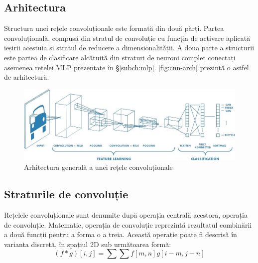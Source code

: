 \subsection*{Arhitectura}
Structura unei rețele convoluționale este formată din două părți.
Partea convoluțională, compusă din stratul de convoluție cu funcția de activare aplicată ieșirii acestuia și stratul de reducere a dimensionalității. A doua parte a structurii este partea de clasificare alcătuită din straturi de neuroni complet conectați asemenea rețelei MLP prezentate în \S\ref{subch:mlp}. \autoref{fig:cnn-arch} prezintă o astfel de arhitectură.
\begin{figure}[ht]
\centering
\includegraphics[width=\textwidth]{fig/cap2/cnn-arch.jpeg}
\caption{Arhitectura generală a unei rețele convoluționale \cite{online:cnn-arch}}
\label{fig:cnn-arch}
\end{figure}

\subsection*{Straturile de convoluție}
Rețelele convoluționale sunt denumite după operația centrală acestora, operația de convoluție. Matematic, operația de convoluție reprezintă rezultatul combinării a două funcții pentru a forma o a treia. Această operație poate fi descrisă în varianta discretă, în spațiul 2D sub următoarea formă:
\begin{equation}
(f*g)[i,j]=\sum\sum f[m,n]g[i-m,j-n]
\label{eq:conv-dis-2D}
\end{equation}

